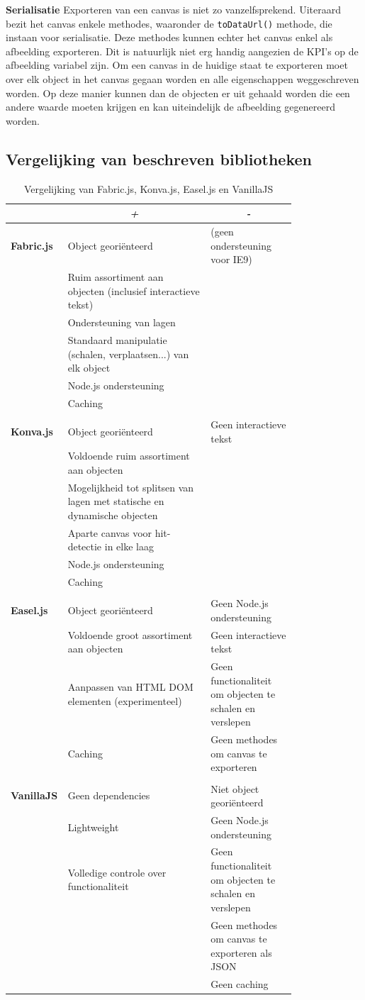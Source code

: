 \textbf{Serialisatie} \break
Exporteren van een canvas is niet zo vanzelfsprekend. Uiteraard bezit het canvas enkele methodes, waaronder de \texttt{toDataUrl()} methode, die instaan voor serialisatie. Deze methodes kunnen echter het canvas enkel als afbeelding exporteren. Dit is natuurlijk niet erg handig aangezien de KPI's op de afbeelding variabel zijn. Om een canvas in de huidige staat te exporteren moet over elk object in het canvas gegaan worden en alle eigenschappen weggeschreven worden. Op deze manier kunnen dan de objecten er uit gehaald worden die een andere waarde moeten krijgen en kan uiteindelijk de afbeelding gegenereerd worden. 

\newpage
\subsection{Vergelijking van beschreven bibliotheken} \label{vergelijkingBibliotheken}

\begin{table}[htbp]
	\centering
	\begin{tabular}{|l|p{0.5\linewidth}|p{0.3\linewidth}|}
		\hline
		 &
		\multicolumn{1}{|c|}{\textit{\textbf{+}}} & \multicolumn{1}{c|}{\textit{\textbf{-}}}                                                   \tabularnewline \hline
		\textbf{Fabric.js} & Object geori\"{e}nteerd & (geen ondersteuning voor IE9)\tabularnewline
		&Ruim assortiment aan objecten (inclusief interactieve tekst)&\tabularnewline 
		&Ondersteuning van lagen&\tabularnewline 
		&Standaard manipulatie (schalen, verplaatsen...) van elk object&\tabularnewline 
		&Node.js ondersteuning&\tabularnewline 
		&Caching&\tabularnewline 
		&&\tabularnewline 
		\textbf{Konva.js}&Object geori\"{e}nteerd & Geen interactieve tekst\tabularnewline 
		&Voldoende ruim assortiment aan objecten&\tabularnewline 
		&Mogelijkheid tot splitsen van lagen met statische en dynamische objecten&\tabularnewline 
		&Aparte canvas voor hit-detectie in elke laag&\tabularnewline 
		&Node.js ondersteuning&\tabularnewline 
		&Caching&\tabularnewline 
		&&\tabularnewline 
		\textbf{Easel.js}&Object geori\"{e}nteerd&Geen Node.js ondersteuning\tabularnewline 
		&Voldoende groot assortiment aan objecten&Geen interactieve tekst\tabularnewline 
		&Aanpassen van HTML DOM elementen (experimenteel)&Geen functionaliteit om objecten te schalen en verslepen\tabularnewline 
		&Caching&Geen methodes om canvas te exporteren\tabularnewline 
		&&\tabularnewline 
		\textbf{VanillaJS}&Geen dependencies&Niet object geori\"{e}nteerd\tabularnewline 
		&Lightweight&Geen Node.js ondersteuning\tabularnewline 		
		&Volledige controle over functionaliteit&Geen functionaliteit om objecten te schalen en verslepen\tabularnewline 
		&&Geen methodes om canvas te exporteren als JSON\tabularnewline 
		&&Geen caching\tabularnewline 
 \hline
	\end{tabular}
	\caption{Vergelijking van Fabric.js, Konva.js, Easel.js en VanillaJS}
	\label{tabeltextureprofiling}   
\end{table}

